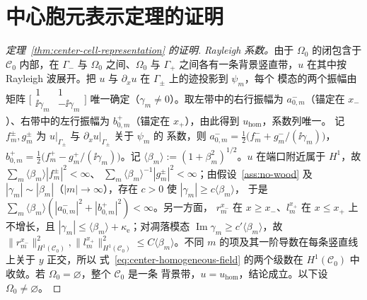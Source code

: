 \clearpage
\appendix

\section{中心胞元表示定理的证明}
\label{app:center-cell}

\begin{proof}[定理~\ref{thm:center-cell-representation} 的证明]
  \emph{Rayleigh 系数。}由于 $\Omega_0$ 的闭包含于 $\mathcal C_0$ 内部，在 $\Gamma_-$ 与
  $\Omega_0$ 之间、$\Omega_0$ 与 $\Gamma_+$ 之间各有一条背景竖直带，$u$ 在其中按
  Rayleigh 波展开。把 $u$ 与 $\partial_xu$ 在 $\Gamma_\pm$ 上的迹投影到 $\psi_m$，每个
  模态的两个振幅由矩阵 $\bigl[\begin{smallmatrix}1&1\\ \ii\gamma_m&-\ii\gamma_m
  \end{smallmatrix}\bigr]$ 唯一确定（$\gamma_m\ne0$）。取左带中的右行振幅为
  $a^-_{0,m}$（锚定在 $x_-$）、右带中的左行振幅为 $b^+_{0,m}$（锚定在 $x_+$），由此得到
  $u_{\mathrm{hom}}$，系数列唯一。
  记 $f^\pm_m,g^\pm_m$ 为 $u|_{\Gamma_\pm}$ 与 $\partial_xu|_{\Gamma_\pm}$ 关于 $\psi_m$ 的
  系数，则
  $a^-_{0,m}=\tfrac12\bigl(f^-_m+g^-_m/(\ii\gamma_m)\bigr)$，
  $b^+_{0,m}=\tfrac12\bigl(f^+_m-g^+_m/(\ii\gamma_m)\bigr)$。记
  $\langle\beta_m\rangle:=(1+\beta_m^2)^{1/2}$。$u$ 在端口附近属于 $H^1$，故
  $\sum_m\langle\beta_m\rangle|f^\pm_m|^2<\infty$、
  $\sum_m\langle\beta_m\rangle^{-1}|g^\pm_m|^2<\infty$；由假设~\ref{ass:no-wood} 及
  $|\gamma_m|\sim|\beta_m|$（$|m|\to\infty$），存在 $c>0$ 使 $|\gamma_m|\geq c\langle\beta_m\rangle$，
  于是 $\sum_m\langle\beta_m\rangle(|a^-_{0,m}|^2+|b^+_{0,m}|^2)<\infty$。另一方面，
  $r_m^{x_-}$ 在 $x\geq x_-$、$l_m^{x_+}$ 在 $x\leq x_+$ 上不增长，且
  $|\gamma_m|\leq\langle\beta_m\rangle+\kappa_{\mathrm e}$；对凋落模态
  $\operatorname{Im}\gamma_m\geq c'\langle\beta_m\rangle$，故
  $\lVert r_m^{x_-}\rVert_{H^1(\mathcal C_0)}^2,\lVert l_m^{x_+}\rVert_{H^1(\mathcal C_0)}^2
  \leq C\langle\beta_m\rangle$。不同 $m$ 的项及其一阶导数在每条竖直线上关于 $y$ 正交，所以
  式~\eqref{eq:center-homogeneous-field} 的两个级数在 $H^1(\mathcal C_0)$ 中收敛。若 $\Omega_0=\varnothing$，整个 $\mathcal C_0$ 是一条
  背景带，$u=u_{\mathrm{hom}}$，结论成立。以下设 $\Omega_0\ne\varnothing$。


\end{proof}
